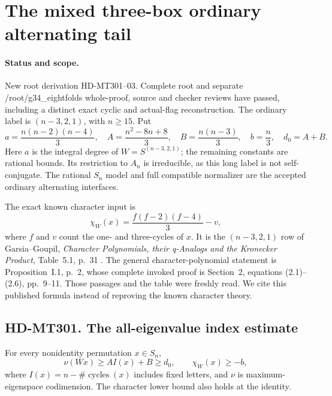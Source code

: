 \section{The mixed three-box ordinary alternating tail}
\label{sec:alternating-mixed-three-tail}

\paragraph{Status and scope.}
New root derivation HD-MT301--03. Complete root and separate
/root/g34\_eightfolds whole-proof, source and checker reviews have
passed, including a distinct exact cyclic and actual-flag reconstruction. The ordinary label is $(n-3,2,1)$,
with $n\ge15$. Put
\[
 a=\frac{n(n-2)(n-4)}3,\quad
 A=\frac{n^2-8n+8}3,\quad B=\frac{n(n-3)}3,\quad
 b=\frac n3,\quad d_0=A+B.                              \tag{MT3.1}
\]
Here $a$ is the integral degree of $W=S^{(n-3,2,1)}$;
the remaining constants are rational bounds. Its restriction
to $A_n$ is irreducible, as this long label is not self-conjugate.
The rational $S_n$ model and full compatible normalizer are
the accepted ordinary alternating interfaces.

The exact known character input is
\[
               \chi_W(x)=\frac{f(f-2)(f-4)}3-v,          \tag{MT3.2}
\]
where $f$ and $v$ count the one- and three-cycles of $x$.
It is the $(n-3,2,1)$ row of Garsia--Goupil,
\emph{Character Polynomials, their q-Analogs and the Kronecker
Product}, Table~5.1, p.~31 \cite{HD:GarsiaGoupil2009}.
The general character-polynomial statement is Proposition~I.1,
p.~2, whose complete invoked proof is Section~2, equations
(2.1)--(2.6), pp.~9--11. Those passages and the table were
freshly read. We cite this published formula instead of
reproving the known character theory.

\subsection*{HD-MT301. The all-eigenvalue index estimate}

\begin{lemma}[HD-MT301]
For every nonidentity permutation $x\in S_n$,
\[
 \nu(Wx)\ge A I(x)+B\ge d_0,
 \qquad \chi_W(x)\ge-b,                                \tag{MT3.3}
\]
where $I(x)=n-\#\operatorname{cycles}(x)$ includes fixed
letters, and $\nu$ is maximum-eigenspace codimension.
The character lower bound also holds at the identity.
\end{lemma}

